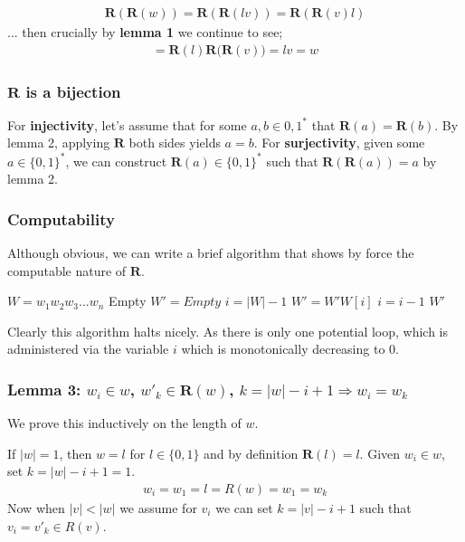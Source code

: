 \documentclass{article}
\begin{document}
\begin{align*}
	\bm{R}(\bm{R}(w)) = \bm{R}(\bm{R}(lv)) = \bm{R}(\bm{R}(v)l) 
\end{align*}
... then crucially by \textbf{lemma 1} we continue to see;
\begin{align*}
	= \bm{R}(l)\bm{R}\bigl(\bm{R}(v)\bigr) = lv = w
\end{align*}

\subsubsection*{$\bm{R}$ is a bijection}
For \textbf{injectivity}, let's assume that for some $a,b \in {0,1}^*$ that $\bm{R}(a) = \bm{R}(b)$. By lemma 2, applying $\bm{R}$ both sides yields $a = b$. For \textbf{surjectivity}, given some $a \in \{0,1\}^*$, we can construct $\bm{R}(a) \in \{0,1\}^*$ such that $\bm{R}(\bm{R}(a)) = a$ by lemma 2.

\subsubsection*{Computability}
Although obvious, we can write a brief algorithm that shows by force the computable nature of $\bm{R}$.

\begin{algorithmic}[1]
	\REQUIRE $W = w_1w_2w_3...w_n$
			\RETURN Empty 
	\ENDIF
	\STATE $W' = Empty$
	\STATE $i = |W| - 1$
		\STATE $W' = W'W[i]$
		\STATE $i = i - 1$
	\ENDWHILE
	\RETURN $W'$ 
\end{algorithmic}

Clearly this algorithm halts nicely. As there is only one potential loop, which is administered via the variable $i$ which is monotonically decreasing to 0.

\subsubsection*{Lemma 3: $w_i \in w$, $w'_k \in \bm{R}(w)$, $k=|w|-i+1 \Rightarrow w_i = w_k$}
We prove this inductively on the length of $w$.

If $|w| = 1$, then $w = l$ for $l\in \{0,1\}$ and by definition $\bm{R}(l) = l$. Given $w_i \in w$, set $k=|w|-i+1=1$. 
\begin{align*}
w_i = w_1 = l = R(w) = w_1 = w_k
\end{align*}
Now when $|v| < |w|$ we assume for $v_i$ we can set $k=|v|-i+1$ such that $v_i = v'_k \in R(v)$.
\end{document}
